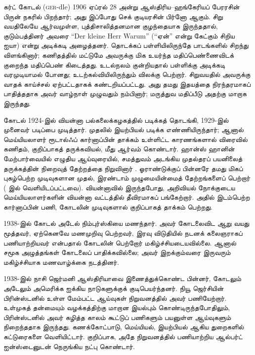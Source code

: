 \documentclass[../../../include/open-logic-section]{subfiles}
\begin{document}



கர்ட் கோடல் (\textsc{ger}-dle) 1906 ஏப்ரல் 28 அன்று ஆஸ்திரிய--ஹங்கேரியப்
பேரரசின் பிருன் நகரில் பிறந்தார்; அது இப்போது செக் குடியரசின் பிர்னோ ஆகும்.
சிறு வயதிலேயே ஆர்வமுள்ள, புத்திசாலித்தனமான குழந்தையாக இருந்ததால்,
குடும்பத்தினர் அவரை ``Der kleine Herr Warum'' (``ஏன்'' என்று கேட்கும் சிறிய
ஐயா) என்று அடிக்கடி அழைத்தனர். தொடக்கப் பள்ளியிலிருந்தே பாடங்களில் சிறந்து
விளங்கினார்; கணிதத்தில் மட்டுமே அவருக்கு மிக உயர்ந்த மதிப்பெண்ணைவிடக்
குறைந்த மதிப்பெண் கிடைத்தது. உடல்நலம் குன்றியதால் பள்ளிக்கு அடிக்கடி
வரமுடியாமல் போனது; உடற்கல்வியிலிருந்தும் விலக்கு பெற்றார். சிறுவயதில்
அவருக்கு வாதக் காய்ச்சல் ஏற்பட்டதாகக் கண்டறியப்பட்டது. அது தமது இதயத்தை
நிரந்தரமாகப் பாதித்ததாக அவர் வாழ்நாள் முழுவதும் நம்பினார்; மருத்துவ
மதிப்பீடு அதற்கு மாறாக இருந்தது.

கோடல் 1924-இல் வியன்னா பல்கலைக்கழகத்தில் படிக்கத் தொடங்கி, 1929-இல்
முனைவர் படிப்பை முடித்தார். முதலில் இயற்பியல் படிக்க எண்ணியிருந்தார்;
ஆனால் மெய்யியலாளர் ரூடால்ஃப் கார்னாப்பின் தாக்கம் உள்ளிட்ட காரணங்களால்
விரைவில் கணிதம், குறிப்பாகத் தருக்கவியல், மீது ஆர்வம் கொண்டார். ஹான்ஸ்
ஹானின் மேற்பார்வையில் எழுதிய ஆய்வுரையில், சமத்துவம் அடங்கிய முதல்தரப்
பயனிலைத் தருக்கத்தின் நிறைவுத் தேற்றத்தை நிறுவினார் \citep{Godel1929}.
ஓராண்டுக்குப் பின்னரே தமது மிகப் புகழ்பெற்ற முடிவுகளான முதல், இரண்டாம்
முழுமையின்மைத் தேற்றங்களைப் பெற்றார் (\citealt{Godel1931} இல்
வெளியிடப்பட்டவை). வியன்னாவில் இருந்தபோது, அறிவியல் நோக்குடைய
மெய்யியலாளர்களின் வியன்னா வட்டத்தில் தீவிரமாகப் பங்கேற்றார். அதில்
இடம்பெற்ற கார்னாப்பின் பணி, கோடலின் முடிவுகளால் குறிப்பாகத் தாக்கம்
பெற்றது.

1938-இல் கோடல் அடேல் நிம்புர்ஸ்கியை மணந்தார். அவர் கோடலைவிட ஆறு
வயது மூத்தவர், ஏற்கெனவே மணமுறிவு பெற்றவர், இரவு விடுதியில் நடனக்
கலைஞராகப் பணியாற்றியவர் என்பதால் கோடலின் பெற்றோர் மகிழ்ச்சியடையவில்லை.
ஆனால் சமூக அழுத்தங்கள் கோடலைப் பாதிக்கவில்லை; அவர் இறக்கும்வரை இருவரும்
மகிழ்ச்சியாக மணவாழ்க்கை நடத்தினர்.

1938-இல் நாசி ஜெர்மனி ஆஸ்திரியாவை இணைத்துக்கொண்ட பின்னர், கோடலும்
அடேலும் அமெரிக்க ஐக்கிய நாடுகளுக்குக் குடிபெயர்ந்தனர். நியூ ஜெர்சியின்
பிரின்ஸ்டனில் உள்ள மேம்பட்ட ஆய்வுகள் நிறுவனத்தில் அவர் பணியேற்றார்.
உள்முகத் தன்மையும் வழக்கத்திற்கு மாறான இயல்பும் கொண்டிருந்தபோதிலும்,
பிரின்ஸ்டனில் அவர் கழித்த காலம் கூட்டுப் பணிகளும் பயனுள்ள ஆய்வுகளும்
நிறைந்ததாக இருந்தது. கணக்கோட்பாடு, மெய்யியல், இயற்பியல் ஆகிய துறைகளில்
கட்டுரைகளை வெளியிட்டார். குறிப்பாக, அதே நிறுவனத்தில் பணியாற்றிய
ஆல்பர்ட் ஐன்ஸ்டைனுடன் நெருங்கிய நட்பு கொண்டார்.
\end{document}
